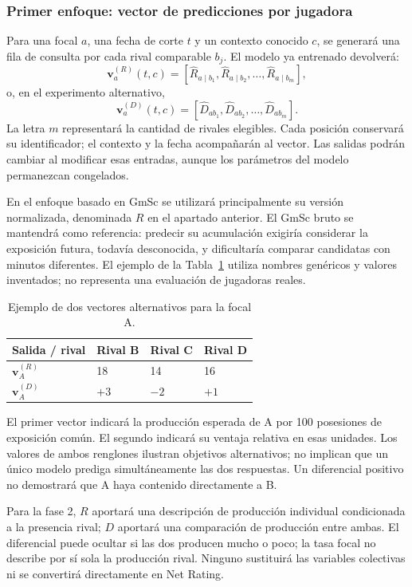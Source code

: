 \subsubsection*{Primer enfoque: vector de predicciones por jugadora}
Para una focal $a$, una fecha de corte $t$ y un contexto conocido $c$, se generará una fila de consulta por cada rival comparable $b_j$. El modelo ya entrenado devolverá:
\[
\mathbf{v}^{(R)}_a(t,c)=
[\widehat R_{a\mid b_1},\widehat R_{a\mid b_2},\ldots,\widehat R_{a\mid b_m}],
\]
o, en el experimento alternativo,
\[
\mathbf{v}^{(D)}_a(t,c)=
[\widehat D_{ab_1},\widehat D_{ab_2},\ldots,\widehat D_{ab_m}].
\]
La letra $m$ representará la cantidad de rivales elegibles. Cada posición conservará su identificador; el contexto y la fecha acompañarán al vector. Las salidas podrán cambiar al modificar esas entradas, aunque los parámetros del modelo permanezcan congelados.

En el enfoque basado en GmSc se utilizará principalmente su versión normalizada, denominada $R$ en el apartado anterior. El GmSc bruto se mantendrá como referencia: predecir su acumulación exigiría considerar la exposición futura, todavía desconocida, y dificultaría comparar candidatas con minutos diferentes. El ejemplo de la Tabla~\ref{tab:vector-ejemplo-616} utiliza nombres genéricos y valores inventados; no representa una evaluación de jugadoras reales.

\begin{table}[htbp]
\centering
\small
\caption{Ejemplo de dos vectores alternativos para la focal A.}
\label{tab:vector-ejemplo-616}
\begin{tabularx}{\textwidth}{@{}lXXX@{}}
\toprule
\textbf{Salida / rival} & \textbf{Rival B} & \textbf{Rival C} & \textbf{Rival D}\\
\midrule
$\mathbf{v}^{(R)}_A$ & 18 & 14 & 16\\
$\mathbf{v}^{(D)}_A$ & $+3$ & $-2$ & $+1$\\
\bottomrule
\end{tabularx}
\end{table}

El primer vector indicará la producción esperada de A por 100 posesiones de exposición común. El segundo indicará su ventaja relativa en esas unidades. Los valores de ambos renglones ilustran objetivos alternativos; no implican que un único modelo prediga simultáneamente las dos respuestas. Un diferencial positivo no demostrará que A haya contenido directamente a B.

Para la fase 2, $R$ aportará una descripción de producción individual condicionada a la presencia rival; $D$ aportará una comparación de producción entre ambas. El diferencial puede ocultar si las dos producen mucho o poco; la tasa focal no describe por sí sola la producción rival. Ninguno sustituirá las variables colectivas ni se convertirá directamente en Net Rating.

